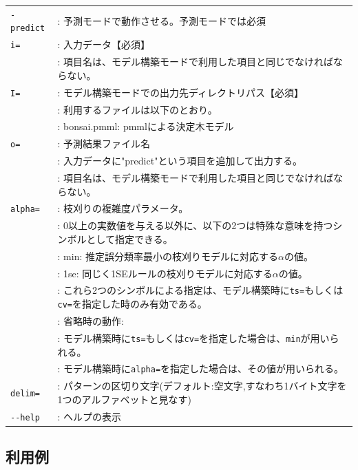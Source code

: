 \begin{table}[htbp]
{\small
\begin{tabular}{ll}
\verb|-predict| & : 予測モードで動作させる。予測モードでは必須 \\
\verb|i=|       & : 入力データ【必須】 \\
                & : 項目名は、モデル構築モードで利用した項目と同じでなければならない。 \\
\verb|I=|       & : モデル構築モードでの出力先ディレクトリパス【必須】 \\
                & : 利用するファイルは以下のとおり。 \\
                & :   bonsai.pmml: pmmlによる決定木モデル  \\
\verb|o=|       & : 予測結果ファイル名 \\
                & :   入力データに"predict"という項目を追加して出力する。\\
                & : 項目名は、モデル構築モードで利用した項目と同じでなければならない。 \\
\verb|alpha=|   & : 枝刈りの複雑度パラメータ。 \\
                & : 0以上の実数値を与える以外に、以下の2つは特殊な意味を持つシンボルとして指定できる。 \\
                & :   min: 推定誤分類率最小の枝刈りモデルに対応する$\alpha$の値。\\
                & :   1se: 同じく1SEルールの枝刈りモデルに対応する$\alpha$の値。\\
                & :        これら2つのシンボルによる指定は、モデル構築時に\verb|ts=|もしくは\verb|cv=|を指定した時のみ有効である。\\
                & : 省略時の動作:\\
                & : モデル構築時に\verb|ts=|もしくは\verb|cv=|を指定した場合は、\verb|min|が用いられる。\\
                & : モデル構築時に\verb|alpha=|を指定した場合は、その値が用いられる。 \\
\verb|delim=|   & : パターンの区切り文字(デフォルト:空文字,すなわち1バイト文字を1つのアルファベットと見なす) \\
\verb|--help|   & : ヘルプの表示\\

\end{tabular} 
}
\end{table} 


\subsection{利用例}
